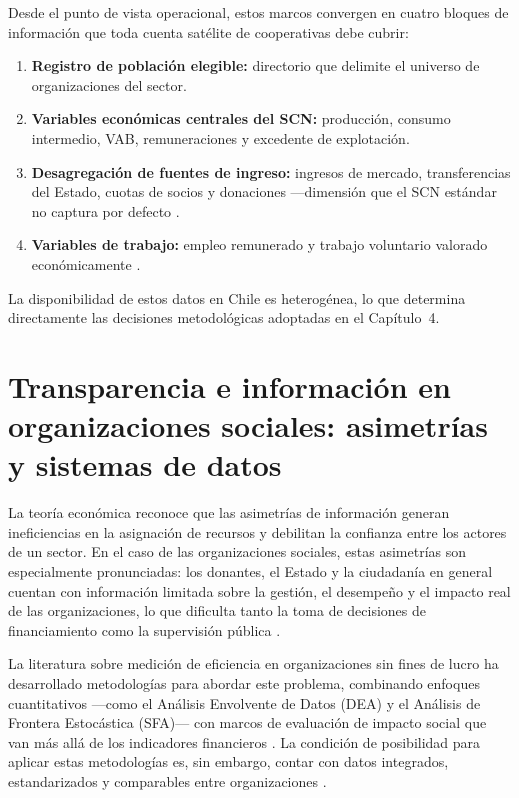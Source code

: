 Desde el punto de vista operacional, estos marcos convergen en cuatro bloques de 
información que toda cuenta satélite de cooperativas debe cubrir:

\begin{enumerate}
    \item \textbf{Registro de población elegible:} directorio que delimite el universo 
    de organizaciones del sector.
    \item \textbf{Variables económicas centrales del SCN:} producción, consumo intermedio, 
    VAB, remuneraciones y excedente de explotación.
    \item \textbf{Desagregación de fuentes de ingreso:} ingresos de mercado, transferencias 
    del Estado, cuotas de socios y donaciones ---dimensión que el SCN estándar no 
    captura por defecto \cite{vereinte_nationen_satellite_2018}.
    \item \textbf{Variables de trabajo:} empleo remunerado y trabajo voluntario valorado 
    económicamente \cite{barea_tejeiro_manual_2007}.
\end{enumerate}

La disponibilidad de estos datos en Chile es heterogénea, lo que determina 
directamente las decisiones metodológicas adoptadas en el Capítulo~4.



\section{Transparencia e información en organizaciones sociales: 
asimetrías y sistemas de datos}
\label{sec:transparencia}
La teoría económica reconoce que las asimetrías de información generan 
ineficiencias en la asignación de recursos y debilitan la confianza entre 
los actores de un sector. En el caso de las organizaciones sociales, estas 
asimetrías son especialmente pronunciadas: los donantes, el Estado y la 
ciudadanía en general cuentan con información limitada sobre la gestión, 
el desempeño y el impacto real de las organizaciones, lo que dificulta 
tanto la toma de decisiones de financiamiento como la supervisión pública 
\cite{coupet_toward_2019}.

La literatura sobre medición de eficiencia en organizaciones sin fines de 
lucro ha desarrollado metodologías para abordar este problema, combinando 
enfoques cuantitativos ---como el Análisis Envolvente de Datos (DEA) y el 
Análisis de Frontera Estocástica (SFA)--- con marcos de evaluación de 
impacto social que van más allá de los indicadores financieros 
\cite{coupet_toward_2019}. La condición de posibilidad para aplicar estas 
metodologías es, sin embargo, contar con datos integrados, estandarizados 
y comparables entre organizaciones .

